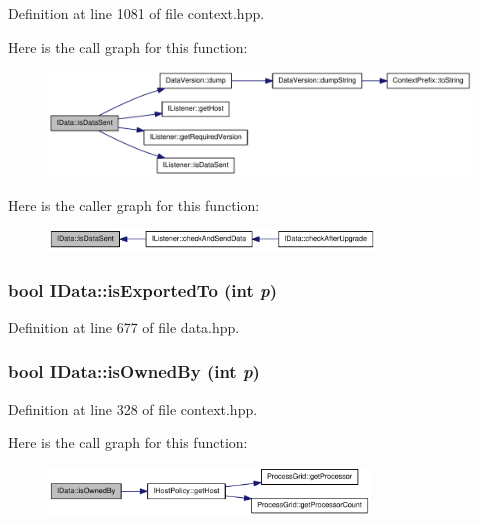 Definition at line 1081 of file context.hpp.

Here is the call graph for this function:\nopagebreak
\begin{figure}[H]
\begin{center}
\leavevmode
\includegraphics[width=318pt]{class_i_data_a37f03e8f2b04b4f54c6b5768f52c0845_cgraph}
\end{center}
\end{figure}


Here is the caller graph for this function:\nopagebreak
\begin{figure}[H]
\begin{center}
\leavevmode
\includegraphics[width=246pt]{class_i_data_a37f03e8f2b04b4f54c6b5768f52c0845_icgraph}
\end{center}
\end{figure}
\hypertarget{class_i_data_af8a6d0f3f71d376613234b4d896c95e3}{
\subsubsection[{isExportedTo}]{\setlength{\rightskip}{0pt plus 5cm}bool IData::isExportedTo (int {\em p})}}
\label{class_i_data_af8a6d0f3f71d376613234b4d896c95e3}


Definition at line 677 of file data.hpp.\hypertarget{class_i_data_a11fc47fc59754a19a489c464be31330e}{
\subsubsection[{isOwnedBy}]{\setlength{\rightskip}{0pt plus 5cm}bool IData::isOwnedBy (int {\em p})}}
\label{class_i_data_a11fc47fc59754a19a489c464be31330e}


Definition at line 328 of file context.hpp.

Here is the call graph for this function:\nopagebreak
\begin{figure}[H]
\begin{center}
\leavevmode
\includegraphics[width=242pt]{class_i_data_a11fc47fc59754a19a489c464be31330e_cgraph}
\end{center}
\end{figure}


